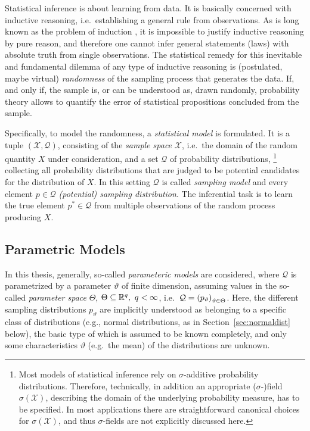 Statistical inference is about learning from data.
It is basically concerned with inductive reasoning,
i.e.\ establishing a general rule from observations.
As is long known as the problem of induction \cite{1739:hume},
it is impossible to justify inductive reasoning by pure reason,
and therefore one cannot infer general statements (laws) with absolute truth from single observations.
The statistical remedy for this inevitable and fundamental dilemma of any type of inductive reasoning is
(postulated, maybe virtual) \emph{randomness} of the sampling process that generates the data.
If, and only if, the sample is, or can be understood as, drawn randomly,
probability theory allows to quantify the error of statistical propositions concluded from the sample.

Specifically, to model the randomness, a \emph{statistical model} is formulated.
It is a tuple $(\mathcal{X}, \mathcal{Q})$, consisting of the \emph{sample space} $\mathcal{X}$,
i.e.\ the domain of the random quantity $X$ under consideration,
and a set $\mathcal{Q}$ of probability distributions,%
\footnote{Most models of statistical inference rely on $\sigma$-additive probability distributions.
Therefore, technically, in addition an appropriate ($\sigma$-)field $\sigma(\mathcal{X})$,
describing the domain of the underlying probability measure, has to be specified.
In most applications there are straightforward canonical choices for $\sigma(\mathcal{X})$,
and thus $\sigma$-fields are not explicitly discussed here.}
collecting all probability distributions that are judged to be potential candidates for the distribution of $X$.
In this setting $\mathcal{Q}$ is called \emph{sampling model} and every element $p\in \mathcal{Q}$ \emph{(potential) sampling distribution}.
The inferential task is to learn the true element $p^* \in \mathcal{Q}$ from multiple observations of the random process producing $X$.


\subsection{Parametric Models}
\label{sec:parametricmodels}

In this thesis, generally, so-called \emph{parameteric models} are considered,
where $\mathcal{Q}$ is pa\-ra\-me\-trized by a parameter $\vartheta$ of finite dimension,
assuming values in the so-called \emph{parameter space} $\Theta$, $\Theta \subseteq \mathbb{R}^q, \ q < \infty$,
i.e.\ ${\cal Q}=\left(p_\vartheta\right)_{\vartheta \in \Theta}$.
Here, the different sampling distributions $p_\vartheta$ are implicitly understood as belonging to a specific class of distributions
(e.g., normal distributions, as in Section~\ref{sec:normaldist} below),
the basic type of which is assumed to be known completely,
and only some characteristics $\vartheta$ (e.g.\ the mean) of the distributions are unknown.

